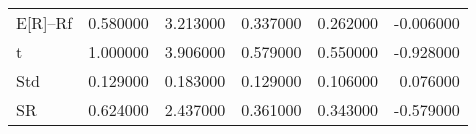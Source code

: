 \begin{tabular}{lrrrrr}
\toprule
\midrule
E[R]--Rf & 0.580000 & 3.213000 & 0.337000 & 0.262000 & -0.006000 \\
t & 1.000000 & 3.906000 & 0.579000 & 0.550000 & -0.928000 \\
Std & 0.129000 & 0.183000 & 0.129000 & 0.106000 & 0.076000 \\
SR & 0.624000 & 2.437000 & 0.361000 & 0.343000 & -0.579000 \\
\bottomrule
\end{tabular}
